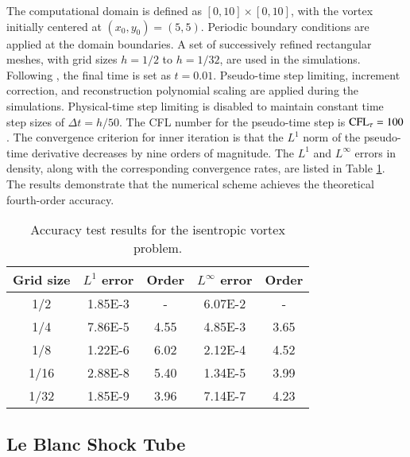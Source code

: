 The computational domain is defined as $[0,10]\times[0,10]$, with the vortex initially centered at $(x_0,y_0)=(5,5)$. Periodic boundary conditions are applied at the domain boundaries.  A set of successively refined rectangular meshes, with grid sizes $h=1/2$ to $h=1/32$, are used in the simulations. Following \cite{zhang2012positivity}, the final time is set as $t=0.01$. 
Pseudo-time step limiting, increment correction, and reconstruction polynomial scaling are applied during the simulations. Physical-time step limiting is disabled to maintain constant time step sizes of $\Delta t = h/50$.
The CFL number for the pseudo-time step is $\text{CFL}_\tau = 100$. The convergence criterion for inner iteration is that the $L^1$ norm of the pseudo-time derivative decreases by nine orders of magnitude.
The $L^1$ and $L^\infty$ errors in density, along with the corresponding convergence rates, are listed in Table \ref{tab:ivResults}. The results demonstrate that the numerical scheme achieves the theoretical fourth-order accuracy.

\begin{table}[htbp!]
    \centering
    \caption{Accuracy test results for the isentropic vortex problem.}
    \label{tab:ivResults}
    \setlength{\tabcolsep}{12.5pt} %
    \renewcommand{\arraystretch}{1.2}
    \begin{tabular}{ c c c c c}
        \toprule
        Grid size & $L^1$ error & Order & $L^\infty$ error & Order \\
        \midrule
        1/2 &1.85E-3 & - & 6.07E-2 & -\\
        1/4 &7.86E-5 & 4.55 & 4.85E-3 & 3.65\\
        1/8 &1.22E-6 & 6.02 & 2.12E-4 & 4.52\\
        1/16 &2.88E-8 & 5.40 & 1.34E-5 & 3.99\\
        1/32 &1.85E-9 & 3.96 & 7.14E-7 & 4.23 \\
    \bottomrule
    \end{tabular}
\end{table}

\subsection{Le Blanc Shock Tube}

